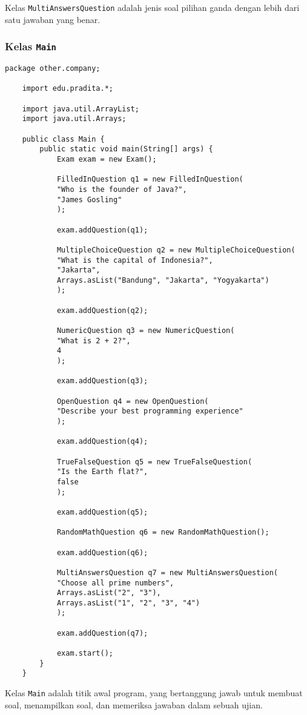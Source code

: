 Kelas \texttt{MultiAnswersQuestion} adalah jenis soal pilihan ganda dengan lebih dari satu jawaban yang benar.

\subsubsection{Kelas \texttt{Main}}

\begin{lstlisting}[style=JavaStyle]
	package other.company;
	
	import edu.pradita.*;
	
	import java.util.ArrayList;
	import java.util.Arrays;
	
	public class Main {
		public static void main(String[] args) {
			Exam exam = new Exam();
			
			FilledInQuestion q1 = new FilledInQuestion(
			"Who is the founder of Java?",
			"James Gosling"
			);
			
			exam.addQuestion(q1);
			
			MultipleChoiceQuestion q2 = new MultipleChoiceQuestion(
			"What is the capital of Indonesia?",
			"Jakarta",
			Arrays.asList("Bandung", "Jakarta", "Yogyakarta")
			);
			
			exam.addQuestion(q2);
			
			NumericQuestion q3 = new NumericQuestion(
			"What is 2 + 2?",
			4
			);
			
			exam.addQuestion(q3);
			
			OpenQuestion q4 = new OpenQuestion(
			"Describe your best programming experience"
			);
			
			exam.addQuestion(q4);
			
			TrueFalseQuestion q5 = new TrueFalseQuestion(
			"Is the Earth flat?",
			false
			);
			
			exam.addQuestion(q5);
			
			RandomMathQuestion q6 = new RandomMathQuestion();
			
			exam.addQuestion(q6);
			
			MultiAnswersQuestion q7 = new MultiAnswersQuestion(
			"Choose all prime numbers",
			Arrays.asList("2", "3"),
			Arrays.asList("1", "2", "3", "4")
			);
			
			exam.addQuestion(q7);
			
			exam.start();
		}
	}
\end{lstlisting}

Kelas \texttt{Main} adalah titik awal program, yang bertanggung jawab untuk membuat soal, menampilkan soal, dan memeriksa jawaban dalam sebuah ujian.


